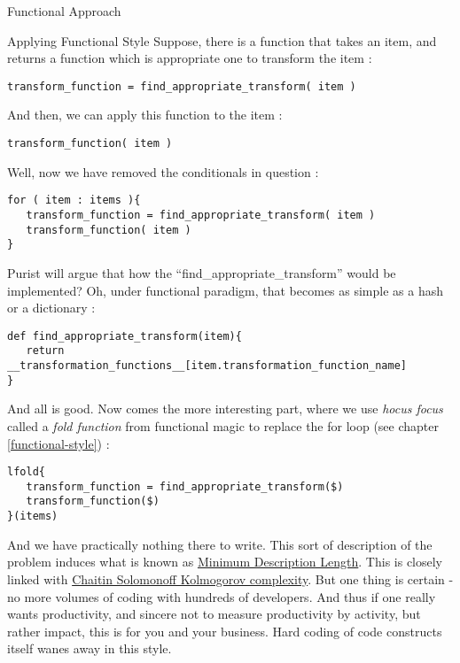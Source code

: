 \begin{section}{Functional Approach}
\begin{subsection}{Applying Functional Style}
Suppose, there is a function that takes an item, and returns a function 
which is appropriate one to transform the item :

\begin{lstlisting}[style=JexlStyle]
transform_function = find_appropriate_transform( item )
\end{lstlisting}

And then, we can apply this function to the item :

\begin{lstlisting}[style=JexlStyle]
transform_function( item )
\end{lstlisting}

Well, now we have removed the conditionals in question :

\begin{lstlisting}[style=JexlStyle]
for ( item : items ){
   transform_function = find_appropriate_transform( item )
   transform_function( item )
}
\end{lstlisting}


Purist will argue that how the ``find\_appropriate\_transform'' would be implemented? 
Oh, under functional paradigm, that becomes as simple as a hash or a dictionary :

\begin{lstlisting}[style=JexlStyle]
def find_appropriate_transform(item){
   return __transformation_functions__[item.transformation_function_name]
}
\end{lstlisting}
And all is good. Now comes the more interesting part, where we use \emph{hocus focus} called a \emph{fold function}  
from functional magic  to replace the for loop (see chapter \ref{functional-style}) :
\begin{lstlisting}[style=JexlStyle]
lfold{
   transform_function = find_appropriate_transform($)
   transform_function($)
}(items)
\end{lstlisting}

And we have practically nothing there to write. This sort of description of the problem induces what is known as 
\href{https://en.wikipedia.org/wiki/Minimum_description_length}{Minimum Description Length}. 
This is closely linked with \href{https://en.wikipedia.org/wiki/Kolmogorov_complexity}{Chaitin Solomonoff Kolmogorov complexity}.
But one thing is certain - no more volumes of coding with hundreds of developers. And thus if one really wants productivity, and sincere not to measure productivity by activity, but rather impact, this is for you and your business. Hard coding of code constructs itself wanes away in this style.


\end{subsection}
\end{section}
